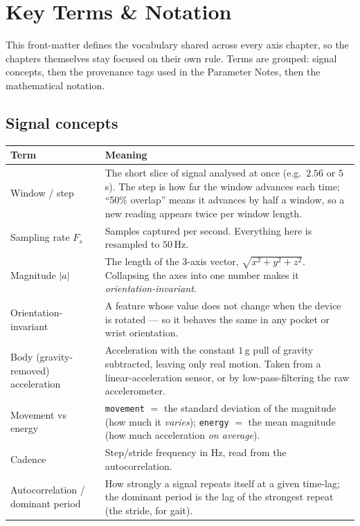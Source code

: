 \chapter*{Key Terms \& Notation}

This front-matter defines the vocabulary shared across every axis chapter, so the chapters
themselves stay focused on their own rule. Terms are grouped: signal concepts, then the
provenance tags used in the Parameter Notes, then the mathematical notation.

\section*{Signal concepts}

\begin{center}
\begin{tabular}{@{}>{\raggedright\arraybackslash}p{3.6cm} >{\raggedright\arraybackslash}p{10.8cm}@{}}
\toprule
\textbf{Term} & \textbf{Meaning} \\
\midrule
Window / step & The short slice of signal analysed at once (e.g.\ $2.56$ or $5$\,s). The step is how far the window advances each time; ``50\% overlap'' means it advances by half a window, so a new reading appears twice per window length. \\
Sampling rate $F_s$ & Samples captured per second. Everything here is resampled to $50$\,Hz. \\
Magnitude $|a|$ & The length of the 3-axis vector, $\sqrt{x^2+y^2+z^2}$. Collapsing the axes into one number makes it \emph{orientation-invariant}. \\
Orientation-invariant & A feature whose value does not change when the device is rotated --- so it behaves the same in any pocket or wrist orientation. \\
Body (gravity-removed) acceleration & Acceleration with the constant $1$\,g pull of gravity subtracted, leaving only real motion. Taken from a linear-acceleration sensor, or by low-pass-filtering the raw accelerometer. \\
Movement vs energy & \texttt{movement} $=$ the standard deviation of the magnitude (how much it \emph{varies}); \texttt{energy} $=$ the mean magnitude (how much acceleration \emph{on average}). \\
Cadence & Step/stride frequency in Hz, read from the autocorrelation. \\
Autocorrelation / dominant period & How strongly a signal repeats itself at a given time-lag; the dominant period is the lag of the strongest repeat (the stride, for gait). \\

\end{tabular}
\end{center}
